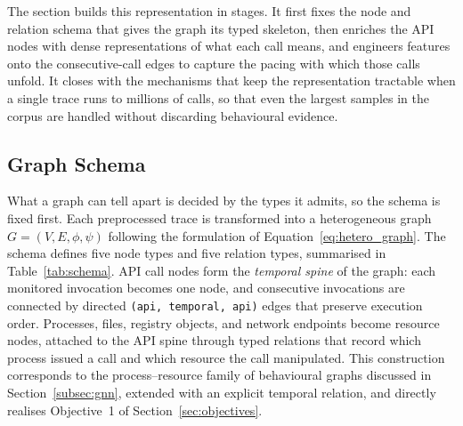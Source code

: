 \documentclass[%
    BCOR=10mm,
    DIV=13,
    toc=bibliography,
    toc=listof,
    oneside,
    12pt,
]{scrbook}
\begin{document}
The section builds this representation in stages. It first fixes the node and
relation schema that gives the graph its typed skeleton, then enriches the API
nodes with dense representations of what each call means, and engineers features
onto the consecutive-call edges to capture the pacing with which those calls
unfold. It closes with the mechanisms that keep the representation tractable when
a single trace runs to millions of calls, so that even the largest samples in
the corpus are handled without discarding behavioural evidence.

\subsection{Graph Schema}
\label{subsec:schema}

What a graph can tell apart is decided by the types it admits, so the schema
is fixed first. Each preprocessed trace is transformed into a heterogeneous
graph $G = (V, E, \phi, \psi)$ following the formulation of
Equation~\ref{eq:hetero_graph}. The schema defines five node types and five
relation types, summarised in Table~\ref{tab:schema}. API call nodes form the
\emph{temporal spine} of the graph: each monitored invocation becomes one
node, and consecutive invocations are connected by directed \texttt{(api,
temporal, api)} edges that preserve execution order. Processes, files,
registry objects, and network endpoints become resource nodes, attached to the
API spine through typed relations that record which process issued a call and
which resource the call manipulated. This construction corresponds to the
process--resource family of behavioural graphs discussed in
Section~\ref{subsec:gnn}, extended with an explicit temporal relation, and
directly realises Objective~1 of Section~\ref{sec:objectives}.
\end{document}
